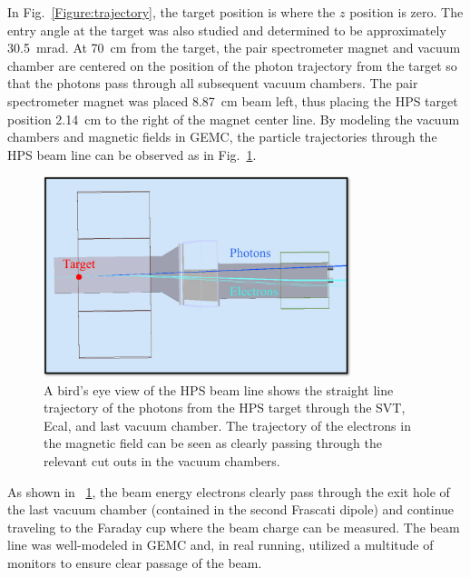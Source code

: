 \documentclass[12pt]{report}
\begin{document}
In Fig.~\ref{Figure:trajectory}, the target position is where the $z$ position is zero. The entry angle at the target was also studied and determined to be approximately 30.5~mrad. At 70~cm from the target, the pair spectrometer magnet and vacuum chamber are centered on the position of the photon trajectory from the target so that the photons pass through all subsequent vacuum chambers. The pair spectrometer magnet was placed 8.87~cm beam left, thus placing the HPS target position 2.14~cm to the right of the magnet center line. By modeling the vacuum chambers and magnetic fields in GEMC, the particle trajectories through the HPS beam line can be observed as in Fig.~\ref{Figure:gemc}.

\begin{figure}[H]
  \centering
      \includegraphics[width=0.8\textwidth]{pics/experiment/beamlineGemc.png}
  \caption[HPS beamline simulation in GEMC]{A bird's eye view of the HPS beam line shows the straight line trajectory of the photons from the HPS target through the SVT, Ecal, and last vacuum chamber. The trajectory of the electrons in the magnetic field can be seen as clearly passing through the relevant cut outs in the vacuum chambers.}
  \label{Figure:gemc}
\end{figure}
 
As shown in ~\ref{Figure:gemc}, the beam energy electrons clearly pass through the exit hole of the last vacuum chamber (contained in the second Frascati dipole) and continue traveling to the Faraday cup where the beam charge can be measured. The beam line was well-modeled in GEMC and, in real running, utilized a multitude of monitors to ensure clear passage of the beam.
\end{document}
